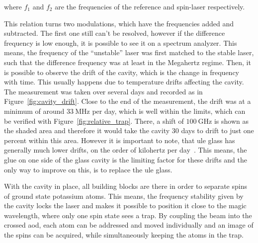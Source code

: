 where $f_1$ and $f_2$ are the frequencies of the reference and spin-laser respectively.

This relation turns two modulations, which have the frequencies added and subtracted. The first one still can't be resolved, however if the difference frequency is low enough, it is possible to see it on a spectrum analyzer. This means, the frequency of the ``unstable'' laser was first matched to the stable laser, such that the difference frequency was at least in the Megahertz regime. Then, it is possible to observe the drift of the cavity, which is the change in frequency with time. This usually happens due to temperature drifts affecting the cavity. The measurement was taken over several days and recorded as in Figure~\ref{fig:cavity_drift}. Close to the end of the measurement, the drift was at a minimum of around $\SI{33}{\mega\hertz}$ per day, which is well within the limits, which can be verified with Figure~\ref{fig:relative_trap}. There, a shift of $\SI{100}{\giga\hertz}$ is shown as the shaded area and therefore it would take the cavity 30 days to drift to just one percent within this area. However it is important to note, that \ac{ule} glass has generally much lower drifts, on the order of kilohertz per day~\cite{Haindl2019}. This means, the glue on one side of the glass cavity is the limiting factor for these drifts and the only way to improve on this, is to replace the \ac{ule} glass.

With the cavity in place, all building blocks are there in order to separate spins of ground state potassium atoms. This means, the frequency stability given by the cavity locks the laser and makes it possible to position it close to the magic wavelength, where only one spin state sees a trap. By coupling the beam into the crossed \ac{aod}, each atom can be addressed and moved individually and an image of the spins can be acquired, while simultaneously keeping the atoms in the trap.

\begin{figure}[tbp]%
\end{figure}
